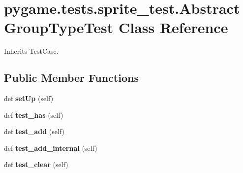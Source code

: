 \hypertarget{classpygame_1_1tests_1_1sprite__test_1_1_abstract_group_type_test}{}\section{pygame.\+tests.\+sprite\+\_\+test.\+Abstract\+Group\+Type\+Test Class Reference}
\label{classpygame_1_1tests_1_1sprite__test_1_1_abstract_group_type_test}


Inherits Test\+Case.

\subsection*{Public Member Functions}
\begin{DoxyCompactItemize}
\item 
\mbox{\label{classpygame_1_1tests_1_1sprite__test_1_1_abstract_group_type_test_a3576e93ce567dfc5df472412f7b89fe7}} 
def {\bfseries set\+Up} (self)
\item 
\mbox{\label{classpygame_1_1tests_1_1sprite__test_1_1_abstract_group_type_test_a2a4f46cc73ada4f3c60a347fcae0a7cc}} 
def {\bfseries test\+\_\+has} (self)
\item 
\mbox{\label{classpygame_1_1tests_1_1sprite__test_1_1_abstract_group_type_test_a3aa60480dec30036f108b8efbeda1460}} 
def {\bfseries test\+\_\+add} (self)
\item 
\mbox{\label{classpygame_1_1tests_1_1sprite__test_1_1_abstract_group_type_test_a22b3153d2dac01941d47eafe5112bdb3}} 
def {\bfseries test\+\_\+add\+\_\+internal} (self)
\item 
\mbox{\label{classpygame_1_1tests_1_1sprite__test_1_1_abstract_group_type_test_a8eb7df8d699870502655bb73344fd2fd}} 
def {\bfseries test\+\_\+clear} (self)
\item 
\mbox{\label{classpygame_1_1tests_1_1sprite__test_1_1_abstract_group_type_test_a47f9caa7e4c7d6aa8267f62d1db861e1}} 

\end{DoxyCompactItemize}
